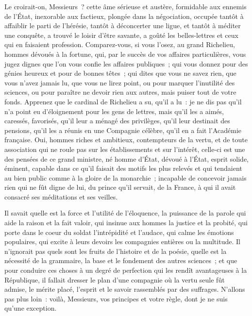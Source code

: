 \documentclass[french,twoside]{book} %
\begin{document}
Le croirait-on, Messieurs ? cette âme sérieuse et austère, formidable aux ennemis de l’État, inexorable aux factieux, plongée dans la négociation, occupée tantôt à affaiblir le parti de l’hérésie, tantôt à déconcerter une ligue, et tantôt à méditer une conquête, a trouvé le loisir d’être savante, a goûté les belles-lettres et ceux qui en faisaient profession. Comparez-vous, si vous l’osez, au grand Richelieu, hommes dévoués à la fortune, qui, par le succès de vos affaires particulières, vous jugez dignes que l’on vous confie les affaires publiques ; qui vous donnez pour des génies heureux et pour de bonnes têtes ; qui dites que vous ne savez rien, que vous n’avez jamais lu, que vous ne lirez point, ou pour marquer l’inutilité des sciences, ou pour paraître ne devoir rien aux autres, mais puiser tout de votre fonds. Apprenez que le cardinal de Richelieu a su, qu’il a lu : je ne dis pas qu’il n’a point eu d’éloignement pour les gens de lettres, mais qu’il les a aimés, caressés, favorisés, qu’il leur a ménagé des privilèges, qu’il leur destinait des pensions, qu’il les a réunis en une Compagnie célèbre, qu’il en a fait l’Académie française. Oui, hommes riches et ambitieux, contempteurs de la vertu, et de toute association qui ne roule pas sur les établissements et sur l’intérêt, celle-ci est une des pensées de ce grand ministre, né homme d’État, dévoué à l’État, esprit solide, éminent, capable dans ce qu’il faisait des motifs les plus relevés et qui tendaient au bien public comme à la gloire de la monarchie ; incapable de concevoir jamais rien qui ne fût digne de lui, du prince qu’il servait, de la France, à qui il avait consacré ses méditations et ses veilles.\par
Il savait quelle est la force et l’utilité de l’éloquence, la puissance de la parole qui aide la raison et la fait valoir, qui insinue aux hommes la justice et la probité, qui porte dans le coeur du soldat l’intrépidité et l’audace, qui calme les émotions populaires, qui excite à leurs devoirs les compagnies entières ou la multitude. Il n’ignorait pas quels sont les fruits de l’histoire et de la poésie, quelle est la nécessité de la grammaire, la base et le fondement des autres sciences ; et que pour conduire ces choses à un degré de perfection qui les rendît avantageuses à la République, il fallait dresser le plan d’une compagnie où la vertu seule fût admise, le mérite placé, l’esprit et le savoir rassemblés par des suffrages. N'allons pas plus loin : voilà, Messieurs, vos principes et votre règle, dont je ne suis qu’une exception.\par
\end{document}
